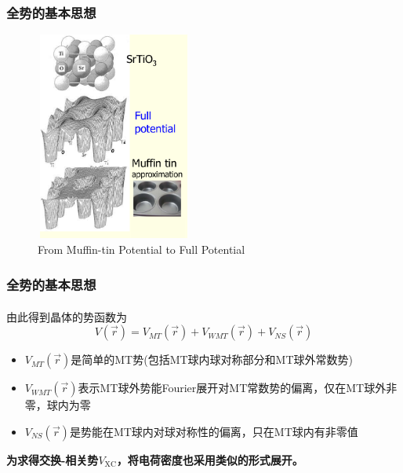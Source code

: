 \documentclass[cjk,slidestop,compress,mathserif,blue]{beamer}
\newcommand{\upcite}[1]{\hspace{0ex}\textsuperscript{\cite{#1}}} %
\begin{document}
\frame
{
\frametitle{全势的基本思想}
\vspace*{-13pt}
\begin{figure}[h!]
\centering
\includegraphics[height=2.70in,width=2.02in,viewport=1 22 507 715,clip]{Figures/MT_FP.png}
\caption{\tiny \textrm{From Muffin-tin Potential to Full Potential}}%
\label{Muffin_tin_FP}
\end{figure}
}

\frame
{
\frametitle{全势的基本思想}
由此得到晶体的势函数为\upcite{Comp_Method}
$$ V(\vec r)=V_{MT}(\vec r)+V_{WMT}(\vec r)+V_{NS}(\vec r)
  \label{eq:solid-64}
$$
\begin{itemize}
	\item $V_{MT}(\vec r)$是简单的\textrm{MT}势(包括\textrm{MT}球内球对称部分和\textrm{MT}球外常数势)
	\item $V_{WMT}(\vec r)$表示\textrm{MT}球外势能\textrm{Fourier}展开对\textrm{MT}常数势的偏离，仅在\textrm{MT}球外非零，球内为零
	\item $V_{NS}(\vec r)$是势能在\textrm{MT}球内对球对称性的偏离，只在\textrm{MT}球内有非零值
\end{itemize}
\textbf{\large 为求得交换-相关势$V_{\mathrm{XC}}$，将电荷密度也采用类似的形式展开。}
}
\end{document}

